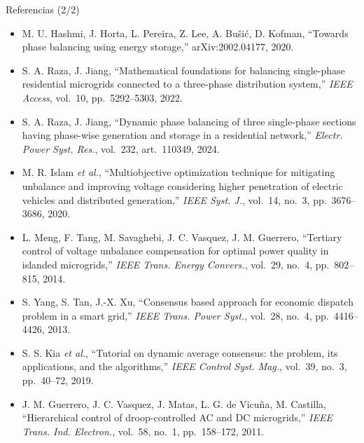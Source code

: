 \documentclass[aspectratio=169,10pt,t]{beamer}
\begin{document}
\begin{frame}{Referencias (2/2)}
  \fontsize{6.6}{7.9}\selectfont
  \begin{itemize}\setlength\itemsep{1pt}
    \item[{[10]}] M. U. Hashmi, J. Horta, L. Pereira, Z. Lee, A. Bušić, D. Kofman, ``Towards phase balancing using energy storage,'' arXiv:2002.04177, 2020.
    \item[{[11]}] S. A. Raza, J. Jiang, ``Mathematical foundations for balancing single-phase residential microgrids connected to a three-phase distribution system,'' \emph{IEEE Access}, vol.~10, pp.~5292--5303, 2022.
    \item[{[12]}] S. A. Raza, J. Jiang, ``Dynamic phase balancing of three single-phase sections having phase-wise generation and storage in a residential network,'' \emph{Electr. Power Syst. Res.}, vol.~232, art.~110349, 2024.
    \item[{[13]}] M. R. Islam \emph{et al.}, ``Multiobjective optimization technique for mitigating unbalance and improving voltage considering higher penetration of electric vehicles and distributed generation,'' \emph{IEEE Syst. J.}, vol.~14, no.~3, pp.~3676--3686, 2020.
    \item[{[14]}] L. Meng, F. Tang, M. Savaghebi, J. C. Vasquez, J. M. Guerrero, ``Tertiary control of voltage unbalance compensation for optimal power quality in islanded microgrids,'' \emph{IEEE Trans. Energy Convers.}, vol.~29, no.~4, pp.~802--815, 2014.
    \item[{[15]}] S. Yang, S. Tan, J.-X. Xu, ``Consensus based approach for economic dispatch problem in a smart grid,'' \emph{IEEE Trans. Power Syst.}, vol.~28, no.~4, pp.~4416--4426, 2013.
    \item[{[16]}] S. S. Kia \emph{et al.}, ``Tutorial on dynamic average consensus: the problem, its applications, and the algorithms,'' \emph{IEEE Control Syst. Mag.}, vol.~39, no.~3, pp.~40--72, 2019.
    \item[{[17]}] J. M. Guerrero, J. C. Vasquez, J. Matas, L. G. de Vicuña, M. Castilla, ``Hierarchical control of droop-controlled AC and DC microgrids,'' \emph{IEEE Trans. Ind. Electron.}, vol.~58, no.~1, pp.~158--172, 2011.
  \end{itemize}
\end{frame}
\end{document}
